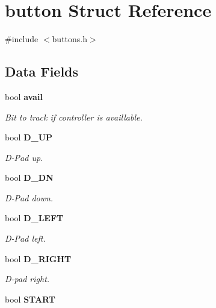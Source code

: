 \section{button Struct Reference}
\label{structbutton}


{\ttfamily \#include $<$buttons.\-h$>$}

\subsection*{Data Fields}
\begin{DoxyCompactItemize}
\item 
bool {\bf avail}\label{structbutton_a38f5f8c438b2382d4a1937d124d0edee}

\begin{DoxyCompactList}\small\item\em Bit to track if controller is availlable. \end{DoxyCompactList}\item 
bool {\bf D\-\_\-\-U\-P}\label{structbutton_a5c0a188da90fd9f779b09139f2255290}

\begin{DoxyCompactList}\small\item\em D-\/\-Pad up. \end{DoxyCompactList}\item 
bool {\bf D\-\_\-\-D\-N}\label{structbutton_a8b7fdb4bf84a17bfb298945e1d76b81b}

\begin{DoxyCompactList}\small\item\em D-\/\-Pad down. \end{DoxyCompactList}\item 
bool {\bf D\-\_\-\-L\-E\-F\-T}\label{structbutton_adfe927f5dd4989b3e6086d63a0698dc3}

\begin{DoxyCompactList}\small\item\em D-\/\-Pad left. \end{DoxyCompactList}\item 
bool {\bf D\-\_\-\-R\-I\-G\-H\-T}\label{structbutton_a787f4350c7b6d6f8e265d85c40bbaee9}

\begin{DoxyCompactList}\small\item\em D-\/pad right. \end{DoxyCompactList}\item 
bool {\bf S\-T\-A\-R\-T}\label{structbutton_a991094a2cc72be82f14668a78f8c2cc6}


\end{DoxyCompactItemize}
